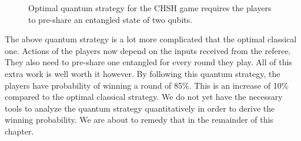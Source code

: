 \begin{figure}[t]
    \centering
    
    \caption[Optimal quantum CHSH game strategy.]{Optimal quantum strategy for the CHSH game requires the players to pre-share an entangled state of two qubits.}
    \label{fig:chsh-game}
\end{figure}

The above quantum strategy is a lot more complicated that the optimal classical one.
Actions of the players now depend on the inputs received from the referee.
They also need to pre-share one entangled for every round they play.
All of this extra work is well worth it however.
By following this quantum strategy, the players have probability of winning a round of 85\%.
This is an increase of 10\% compared to the optimal classical strategy.
We do not yet have the necessary tools to analyze the quantum strategy quantitatively in order to derive the winning probability.
We are about to remedy that in the remainder of this chapter.



